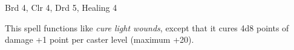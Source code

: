 
\begin{description*}
\item[Level:] Brd 4, Clr 4, Drd 5, Healing 4
\end{description*}

This spell functions like \textit{cure light wounds}, except that it cures 4d8
points of damage +1 point per caster level (maximum +20).